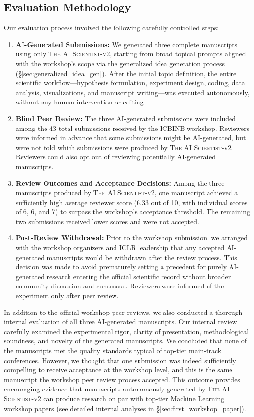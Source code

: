\documentclass[11pt, a4paper]{include/gdm_format}
\newcommand{\ouralgo}{\textsc{The AI Scientist-v2}\xspace}
\begin{document}
\subsection{Evaluation Methodology}

Our evaluation process involved the following carefully controlled steps:

\begin{enumerate}[label=\textbf{\arabic*.}, leftmargin=*]
    \item \textbf{AI-Generated Submissions:}
    We generated three complete manuscripts using only \ouralgo, starting from broad topical prompts aligned with the workshop's scope via the generalized idea generation process (\S\ref{sec:generalized_idea_gen}). After the initial topic definition, the entire scientific workflow—hypothesis formulation, experiment design, coding, data analysis, visualizations, and manuscript writing—was executed autonomously, without any human intervention or editing.
    \item \textbf{Blind Peer Review:}
    The three AI-generated submissions were included among the 43 total submissions received by the ICBINB workshop. Reviewers were informed in advance that some submissions might be AI-generated, but were not told which submissions were produced by \ouralgo. Reviewers could also opt out of reviewing potentially AI-generated manuscripts.
    \item \textbf{Review Outcomes and Acceptance Decisions:} 
    Among the three manuscripts produced by \ouralgo, one manuscript achieved a sufficiently high average reviewer score (6.33 out of 10, with individual scores of 6, 6, and 7) to surpass the workshop's acceptance threshold. The remaining two submissions received lower scores and were not accepted.
    \item \textbf{Post-Review Withdrawal:} 
    Prior to the workshop submission, we arranged with the workshop organizers and ICLR leadership that any accepted AI-generated manuscripts would be withdrawn after the review process. This decision was made to avoid prematurely setting a precedent for purely AI-generated research entering the official scientific record without broader community discussion and consensus. Reviewers were informed of the experiment only after peer review.
\end{enumerate}

In addition to the official workshop peer reviews, we also conducted a thorough internal evaluation of all three AI-generated manuscripts. Our internal review carefully examined the experimental rigor, clarity of presentation, methodological soundness, and novelty of the generated manuscripts. We concluded that none of the manuscripts met the quality standards typical of top-tier main-track conferences.
However, we thought that one submission was indeed sufficiently compelling to receive acceptance at the workshop level, and this is the same manuscript the workshop peer review process accepted. This outcome provides encouraging evidence that manuscripts autonomously generated by \ouralgo can produce research on par with top-tier Machine Learning workshop papers (see detailed internal analyses in \S \ref{sec:first_workshop_paper}). 
\end{document}
